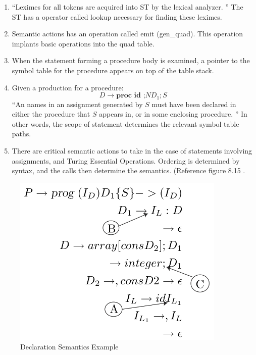 \documentclass[11pt]{article}
\begin{document}
\begin{enumerate}
\item ``Leximes for all tokens are acquired into ST by the lexical analyzer. ''  \cite{ullmanCompillers} The ST has a operator called lookup necessary for finding these leximes.
\item Semantic actions has an operation called emit (gen\_quad).  This operation implants basic operations into the quad table.  
\item When the statement forming a procedure body is examined, a pointer to the symbol table for the procedure appears on top of the table stack.  
\item Given a production for a procedure:
\[ D \to \textbf {proc id ;} N D_1 ; S \]
``An names in an assignment generated by $S$ must have been declared in either the procedure that $S$ appears in, or in some enclosing procedure.  ''   \cite{ullmanCompillers}  In other words, the scope of statement determines the relevant symbol table paths.  
\item There are critical semantic actions to take in the case of statements involving  assignments, and Turing Essential Operations.    Ordering is determined by syntax, and the calls then determine the semantics.    (Reference figure 8.15 \cite {ullmanCompilers}.
\end{enumerate}

\begin{figure}[htbp] %
   \centering
   \includegraphics[width=4in]{declSemActA.png} 
   \caption{Declaration Semantics Example}
   \label{fig:example}
\end{figure}
\end{document}
